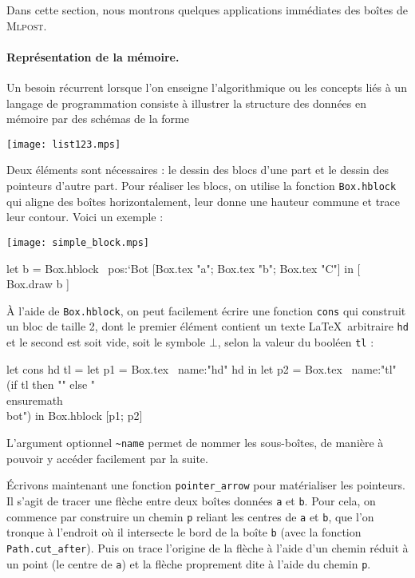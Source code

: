 \documentclass[twoside]{studia-Hermann}
\newcommand{\mlpost}{\textsc{Mlpost}}
\begin{document}
Dans cette section, nous montrons quelques applications immédiates des
boîtes de \mlpost. 

\paragraph{Représentation de la mémoire.}
Un besoin récurrent lorsque l'on enseigne l'algorithmique ou les
concepts liés à un langage de programmation consiste à illustrer
la structure des données en mémoire par des schémas de la forme
\begin{center}
  \texttt{[image: list123.mps]}
\end{center}
Deux éléments sont nécessaires : le dessin des blocs d'une part et le
dessin des pointeurs d'autre part. Pour réaliser les blocs, on utilise
la fonction \texttt{Box.hblock} qui aligne des boîtes horizontalement,
leur donne une hauteur commune et trace leur contour. Voici un exemple
:

\medskip
\begin{minipage}{0.15\linewidth}
  \texttt{[image: simple\_block.mps]}
\end{minipage}
\begin{minipage}{0.8\linewidth}
\small\begin{ocaml}
let b = Box.hblock ~pos:`Bot [Box.tex "a"; Box.tex "b"; Box.tex "C"] in
[ Box.draw b ]
\end{ocaml}
\end{minipage}

\medskip\noindent À l'aide de \texttt{Box.hblock}, on peut facilement
écrire une fonction \texttt{cons} qui construit un bloc de taille 2,
dont le premier élément contient un texte \LaTeX\ arbitraire
\texttt{hd} et le second est soit vide, soit le symbole $\bot$, selon
la valeur du booléen \texttt{tl} :
\begin{ocaml}
let cons hd tl =
  let p1 = Box.tex ~name:"hd" hd in
  let p2 = Box.tex ~name:"tl" (if tl then "" else "\\ensuremath{\\bot}") in
  Box.hblock [p1; p2]
\end{ocaml}
L'argument optionnel \texttt{\~{}name} permet de nommer les
sous-boîtes, de manière à pouvoir y accéder facilement par la suite.

Écrivons maintenant une fonction \texttt{pointer\_arrow} pour
matérialiser les pointeurs. Il s'agit de tracer une flèche entre deux
boîtes données \texttt{a} et \texttt{b}. Pour cela, on commence par
construire un chemin \texttt{p} reliant les centres de \texttt{a} et
\texttt{b}, que l'on tronque à l'endroit où il intersecte le bord de la boîte
\texttt{b} (avec la fonction \texttt{Path.cut\_after}). Puis on trace
l'origine de la flèche à l'aide d'un chemin réduit à un point (le
centre de \texttt{a}) et la flèche proprement dite à l'aide du chemin
\texttt{p}.
\end{document}

